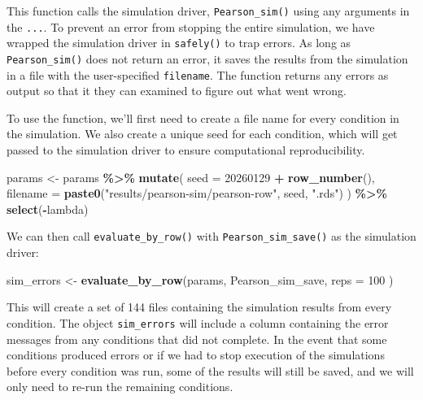 \documentclass[
]{book}
\newenvironment{Shaded}{\begin{snugshade}}{\end{snugshade}}
\newcommand{\AttributeTok}[1]{\textcolor[rgb]{0.13,0.29,0.53}{#1}}
\newcommand{\DecValTok}[1]{\textcolor[rgb]{0.00,0.00,0.81}{#1}}
\newcommand{\FunctionTok}[1]{\textcolor[rgb]{0.13,0.29,0.53}{\textbf{#1}}}
\newcommand{\NormalTok}[1]{#1}
\newcommand{\OtherTok}[1]{\textcolor[rgb]{0.56,0.35,0.01}{#1}}
\newcommand{\SpecialCharTok}[1]{\textcolor[rgb]{0.81,0.36,0.00}{\textbf{#1}}}
\newcommand{\StringTok}[1]{\textcolor[rgb]{0.31,0.60,0.02}{#1}}
\begin{document}
This function calls the simulation driver, \texttt{Pearson\_sim()} using any arguments in the \texttt{...}.
To prevent an error from stopping the entire simulation, we have wrapped the simulation driver in \texttt{safely()} to trap errors.
As long as \texttt{Pearson\_sim()} does not return an error, it saves the results from the simulation in a file with the user-specified \texttt{filename}.
The function returns any errors as output so that it they can examined to figure out what went wrong.

To use the function, we'll first need to create a file name for every condition in the simulation.
We also create a unique seed for each condition, which will get passed to the simulation driver to ensure computational reproducibility.

\begin{Shaded}
\begin{Highlighting}[]
\NormalTok{params }\OtherTok{\textless{}{-}} 
\NormalTok{  params }\SpecialCharTok{\%\textgreater{}\%}
  \FunctionTok{mutate}\NormalTok{(}
    \AttributeTok{seed =} \DecValTok{20260129} \SpecialCharTok{+} \FunctionTok{row\_number}\NormalTok{(),}
    \AttributeTok{filename =} \FunctionTok{paste0}\NormalTok{(}\StringTok{"results/pearson{-}sim/pearson{-}row"}\NormalTok{, seed, }\StringTok{".rds"}\NormalTok{)}
\NormalTok{  ) }\SpecialCharTok{\%\textgreater{}\%}
  \FunctionTok{select}\NormalTok{(}\SpecialCharTok{{-}}\NormalTok{lambda)}
\end{Highlighting}
\end{Shaded}

We can then call \texttt{evaluate\_by\_row()} with \texttt{Pearson\_sim\_save()} as the simulation driver:

\begin{Shaded}
\begin{Highlighting}[]
\NormalTok{sim\_errors }\OtherTok{\textless{}{-}} \FunctionTok{evaluate\_by\_row}\NormalTok{(params, Pearson\_sim\_save, }\AttributeTok{reps =} \DecValTok{100}\NormalTok{ )}
\end{Highlighting}
\end{Shaded}

This will create a set of 144 files containing the simulation results from every condition.
The object \texttt{sim\_errors} will include a column containing the error messages from any conditions that did not complete.
In the event that some conditions produced errors or if we had to stop execution of the simulations before every condition was run, some of the results will still be saved, and we will only need to re-run the remaining conditions.
\end{document}
